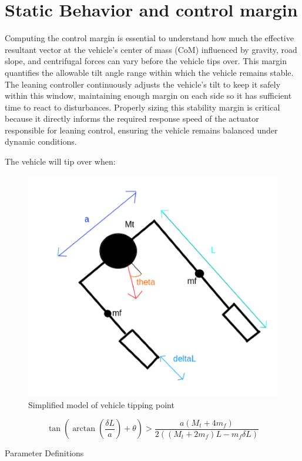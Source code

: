 \section{Static Behavior and control margin}

Computing the control margin is essential to understand how much the effective resultant vector at the vehicle’s center of mass (CoM) influenced by gravity, road slope, and centrifugal forces  can vary before the vehicle tips over. This margin quantifies the allowable tilt angle range within which the vehicle remains stable. The leaning controller continuously adjusts the vehicle’s tilt to keep it safely within this window, maintaining enough margin on each side so it has sufficient time to react to disturbances. Properly sizing this stability margin is critical because it directly informs the required response speed of the actuator responsible for leaning control, ensuring the vehicle remains balanced under dynamic conditions.

The vehicle will tip over when:

\begin{figure}[h!]
    \centering
    \includegraphics[width=0.55\linewidth]{Figures/ch7_tippingPoint.png}
    \caption{Simplified model of vehicle tipping point}
    \label{fig:vehicleTipping}
\end{figure}
$$
\tan\left( \arctan\left(\frac{\delta L}{a}\right) + \theta \right) > \frac{a \left(M_t + 4m_f\right)}{2 \left( (M_t + 2m_f)L - m_f \delta L \right)}
$$


Parameter Definitions

